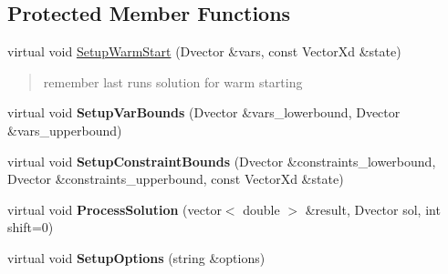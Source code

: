 \subsection*{Protected Member Functions}
\begin{DoxyCompactItemize}
\item 
\mbox{\label{classMPC_aebb4b7be7b8b571e5c542c623cfa1aba}} 
virtual void \mbox{\hyperlink{classMPC_aebb4b7be7b8b571e5c542c623cfa1aba}{Setup\+Warm\+Start}} (Dvector \&vars, const Vector\+Xd \&state)
\begin{DoxyCompactList}\small\item\em \begin{quote}
remember last run\textquotesingle{}s solution for warm starting\end{quote}
\end{DoxyCompactList}\item 
\mbox{\label{classMPC_a85151503d5e29e3832eabfc22dadbc7f}} 
virtual void {\bfseries Setup\+Var\+Bounds} (Dvector \&vars\+\_\+lowerbound, Dvector \&vars\+\_\+upperbound)
\item 
\mbox{\label{classMPC_a0c45ccce078c88436c7db83892efde7c}} 
virtual void {\bfseries Setup\+Constraint\+Bounds} (Dvector \&constraints\+\_\+lowerbound, Dvector \&constraints\+\_\+upperbound, const Vector\+Xd \&state)
\item 
\mbox{\label{classMPC_a034f942cd45fedc786932dcf328ec790}} 
virtual void {\bfseries Process\+Solution} (vector$<$ double $>$ \&result, Dvector sol, int shift=0)
\item 
\mbox{\label{classMPC_ad15f9e5ae586e33af171a3b09363e432}} 
virtual void {\bfseries Setup\+Options} (string \&options)
\end{DoxyCompactItemize}
